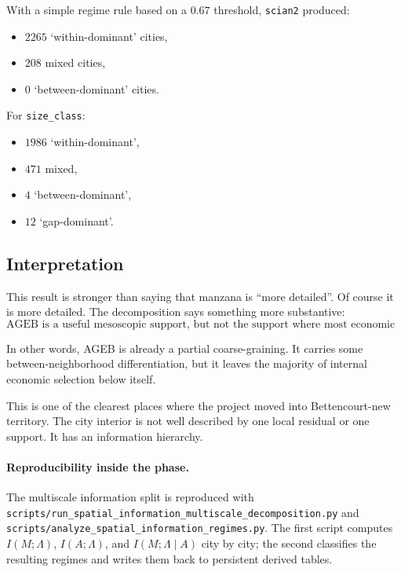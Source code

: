 \documentclass[11pt]{article}
\begin{document}
With a simple regime rule based on a \(0.67\) threshold, \texttt{scian2} produced:
\begin{itemize}
\item \(2265\) `within-dominant' cities,
\item \(208\) mixed cities,
\item \(0\) `between-dominant' cities.
\end{itemize}

For \texttt{size\_class}:
\begin{itemize}
\item \(1986\) `within-dominant',
\item \(471\) mixed,
\item \(4\) `between-dominant',
\item \(12\) `gap-dominant'.
\end{itemize}

\subsection{Interpretation}

This result is stronger than saying that manzana is ``more detailed''. Of course it is more detailed. The decomposition says something more substantive:
\begin{equation}
\text{AGEB is a useful mesoscopic support, but not the support where most economic organization lives.}
\end{equation}

In other words, AGEB is already a partial coarse-graining. It carries some between-neighborhood differentiation, but it leaves the majority of internal economic selection below itself.

This is one of the clearest places where the project moved into Bettencourt-new territory. The city interior is not well described by one local residual or one support. It has an information hierarchy.

\paragraph{Reproducibility inside the phase.}
The multiscale information split is reproduced with
\texttt{scripts/run\_spatial\_information\_multiscale\_decomposition.py}
and
\texttt{scripts/analyze\_spatial\_information\_regimes.py}.
The first script computes \(I(M;\Lambda)\), \(I(A;\Lambda)\), and \(I(M;\Lambda\mid A)\) city by city; the second classifies the resulting regimes and writes them back to persistent derived tables.
\end{document}
